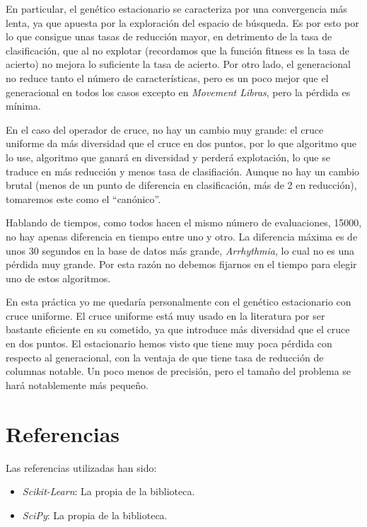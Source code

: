 \documentclass[a4paper, 11pt]{article}
\begin{document}
    En particular, el genético estacionario se caracteriza por una convergencia más lenta, ya que apuesta por la exploración del espacio de búsqueda. Es por esto por lo que consigue unas tasas de reducción mayor, en detrimento de la tasa de clasificación, que al no explotar (recordamos que la función fitness es la tasa de acierto) no mejora lo suficiente la tasa de acierto. Por otro lado, el generacional no reduce tanto el número de características, pero es un poco mejor que el generacional en todos los casos excepto en \emph{Movement Libras}, pero la pérdida es mínima.

    En el caso del operador de cruce, no hay un cambio muy grande: el cruce uniforme da más diversidad que el cruce en dos puntos, por lo que algoritmo que lo use, algoritmo que ganará en diversidad y perderá explotación, lo que se traduce en más reducción y menos tasa de clasifiación. Aunque no hay un cambio brutal (menos de un punto de diferencia en clasificación, más de 2 en reducción), tomaremos este como el ``canónico''.

    Hablando de tiempos, como todos hacen el mismo número de evaluaciones, 15000, no hay apenas diferencia en tiempo entre uno y otro. La diferencia máxima es de unos 30 segundos en la base de datos más grande, \emph{Arrhythmia}, lo cual no es una pérdida muy grande. Por esta razón no debemos fijarnos en el tiempo para elegir uno de estos algoritmos.

    En esta práctica yo me quedaría personalmente con el genético estacionario con cruce uniforme. El cruce uniforme está muy usado en la literatura por ser bastante eficiente en su cometido, ya que introduce más diversidad que el cruce en dos puntos. El estacionario hemos visto que tiene muy poca pérdida con respecto al generacional, con la ventaja de que tiene tasa de reducción de columnas notable. Un poco menos de precisión, pero el tamaño del problema se hará notablemente más pequeño.

  \newpage
  \section{Referencias}

  Las referencias utilizadas han sido:
  \begin{itemize}
    \item \emph{Scikit-Learn}: La propia  de la biblioteca.
    \item \emph{SciPy}: La propia  de la biblioteca.
  \end{itemize}
\end{document}
